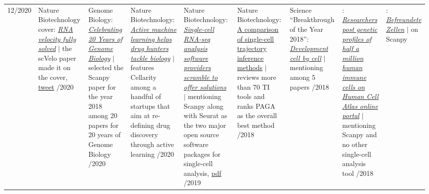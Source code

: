 \vspace{-.5em}
\begin{longtable}[t]{R{\widthC} p{\widthB}}
12/2020
& Nature Biotechnology cover: \href{https://www.nature.com/nbt/volumes/38/issues/12}{\textit{RNA velocity fully solved}} {\footnotesize$\vert$ the scVelo paper made it on the cover, \href{https://twitter.com/slinnarsson/status/1334739560576798722}{tweet}}
/2020
& Genome Biology: \href{https://genomebiology.biomedcentral.com/20years}{\textit{Celebrating 20 Years of Genome Biology}} {\footnotesize$\vert$ selected the Scanpy paper for the year 2018 among 20 papers  for 20 years of Genome Biology}
/2020
& Nature Biotechnology: \href{https://www.nature.com/articles/s41587-020-0521-4}{\textit{Active machine learning helps drug hunters tackle biology}} {\footnotesize$\vert$ features Cellarity among a handful of startups that aim at re-defining drug discovery through active learning}
/2020
& Nature Biotechnology: \href{https://www.nature.com/articles/s41587-020-0449-8}{\textit{Single-cell RNA-seq analysis software providers scramble to offer solutions}} {\footnotesize$\vert$ mentioning Scanpy along with Seurat as the two major open source software packages for single-cell analysis, \href{https://rdcu.be/b2M5l}{pdf}}
/2019
& Nature Biotechnology: \href{https://www.nature.com/articles/s41587-019-0071-9}{A comparison of single-cell trajectory inference methods} {\footnotesize$\vert$ reviews more than 70 TI tools and ranks PAGA as the overall best method}
/2018
& Science ``Breakthrough of the Year 2018'': \href{https://vis.sciencemag.org/breakthrough2018/finalists/#cell-development}{\textit{Development cell by cell}} {\footnotesize$\vert$ mentioning among 5 papers}
/2018
& : \href{https://www.broadinstitute.org/news/researchers-post-genetic-profiles-half-million-human-immune-cells-human-cell-atlas-online}{\textit{Researchers post genetic profiles of half a million human immune cells on Human Cell Atlas online portal}} {\footnotesize$\vert$ mentioning Scanpy and no other single-cell analysis tool}
/2018
& : \href{https://www.helmholtz.de/aktuell/presse_und_medien/mediathek/wissenschaftsbild_des_monats/wissenschaftsbild/artikeldetail/befreundete_zellen/}{\textit{Befreundete Zellen}} {\footnotesize$\vert$ on Scanpy}

\end{longtable}
